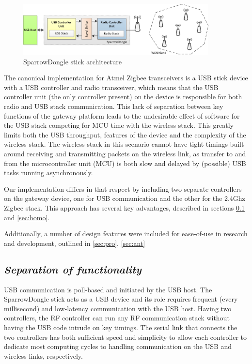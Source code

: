 \label{chap:arch}

\begin{figure}[ht] \centering
\includegraphics[width=0.9\textwidth]{img/Architecture.png}
\caption{SparrowDongle stick architecture} \end{figure}

The canonical implementation for Atmel Zigbee transceivers is a USB stick
device with a USB controller and radio transceiver, which means that the USB
controller unit (the only controller present) on the device is responsible for
both radio and USB stack communication.  This lack of separation between key
functions of the gateway platform leads to the undesirable effect of software
for the USB stack competing for MCU time with the wireless stack. This greatly
limits both the USB throughput, features of the device and the complexity of
the wireless stack. The wireless stack in this scenario cannot have tight
timings built around receiving and transmitting packets on the wireless link,
as transfer to and from the microcontroller unit (MCU) is both slow and delayed
by (possible) USB tasks running asynchronously.

Our implementation differs in that respect by including two separate
controllers on the gateway device, one for USB communication and the other for
the 2.4Ghz Zigbee stack. This approach has several key advantages, described in
sections \ref{sec:func} and \ref{sec:homo}. 

Additionally, a number of design features were included for ease-of-use in
research and development, outlined in \ref{sec:pro}, \ref{sec:ant}


\subsection{\textit{Separation of functionality}} 

\label{sec:func}

USB communication is poll-based and initiated by the USB host. The
SparrowDongle stick acts as a USB device and its role requires frequent (every
millisecond) and low-latency communication with the USB host. Having two
controllers, the RF controller can run any RF communication stack
without having the USB code intrude on key timings. The serial link that
connects the two controllers has both sufficient speed and simplicity to allow
each controller to dedicate most computing cycles to handling communication on
the USB and wireless links, respectively.

